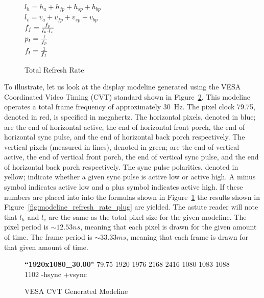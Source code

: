     \begin{figure}
        \centering
        { \Large
            $l_h=h_a+h_{fp}+h_{sp}+h_{bp}$ \vspace{8px} \\
            $l_v=v_a+v_{fp}+v_{sp}+v_{bp}$ \vspace{8px} \\
            $f_f={f_p \over {l_h \cdot l_v}}$ \\
            $p_t={1 \over f_p}$ \vspace{8px} \\
            $f_t={1 \over f_f}$ \vspace{8px}
        }
        \caption{Total Refresh Rate}
        \label{fig:modeline_refresh_rate}
    \end{figure}

    To illustrate, let us look at the display modeline generated using the VESA Coordinated Video Timing (CVT) standard shown in Figure~\ref{fig:modeline_example}. This modeline operates a total frame frequency of approximately \mbox{30 Hz}. The pixel clock 79.75, denoted in red, is specified in megahertz. The horizontal pixels, denoted in blue; are the end of horizontal active, the end of horizontal front porch, the end of horizontal sync pulse, and the end of horizontal back porch respectively. The vertical pixels (measured in lines), denoted in green; are the end of vertical active, the end of vertical front porch, the end of vertical sync pulse, and the end of horizontal back porch respectively. The sync pulse polarities, denoted in yellow; indicate whether a given sync pulse is active low or active high. A minus symbol indicates active low and a plus symbol indicates active high. If these numbers are placed into into the formulas shown in Figure~\ref{fig:modeline_refresh_rate} the results shown in Figure~\ref{fig:modeline_refresh_rate_plug} are yielded. The astute reader will note that $l_h$ and $l_v$ are the same as the total pixel size for the given modeline. The pixel period is $\sim12.53 ns$, meaning that each pixel is drawn for the given amount of time. The frame period is $\sim33.33 ms$, meaning that each frame is drawn for that given amount of time.

    \begin{figure}
        \centering
        { \normalsize
        \textbf{``1920x1080\_30.00"} {\color{red}79.75}  {\color{blue} 1920 1976 2168 2416}  {\color{darkgreen}1080 1083 1088 1102} {\color{olive}-hsync +vsync}
        }
        \caption{VESA CVT Generated Modeline}
        \label{fig:modeline_example}
    \end{figure}

